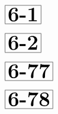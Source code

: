 \documentclass[a4paper, 10pt]{article}
\begin{document}
\begin{minipage}[t]{0.15\textwidth}
                \vspace*{-1.59cm}
        \hspace*{1.25cm}
        $\boxed{\textbf{\Huge6-1}}$
\end{minipage}
\begin{minipage}[t]{0.85\textwidth}
    
\end{minipage}

\begin{minipage}[t]{0.15\textwidth}
                \vspace*{-1.59cm}
        \hspace*{1.25cm}
        $\boxed{\textbf{\Huge6-2}}$
\end{minipage}
\begin{minipage}[t]{0.85\textwidth}
    
\end{minipage}

\begin{minipage}[t]{0.15\textwidth}
                \vspace*{-1.59cm}
        \hspace*{0.75cm}
        $\boxed{\textbf{\Huge6-77}}$
\end{minipage}
\begin{minipage}[t]{0.85\textwidth}
    
\end{minipage}

\begin{minipage}[t]{0.15\textwidth}
                \vspace*{-1.59cm}
        \hspace*{0.75cm}
        $\boxed{\textbf{\Huge6-78}}$
\end{minipage}
\begin{minipage}[t]{0.85\textwidth}
    
\end{minipage}

\thispagestyle{empty}
\end{document}
